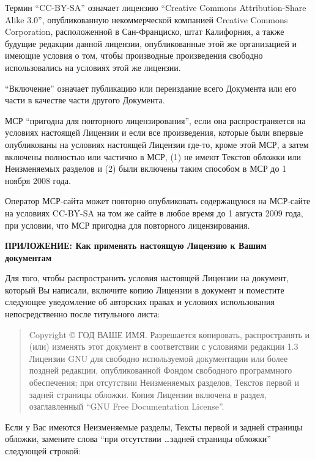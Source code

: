 Термин \enquote{CC-BY-SA} означает лицензию \enquote{Creative Commons
  Attribution-Share Alike 3.0}, опубликованную некоммерческой
компанией Creative Commons Corporation, расположенной в Сан-Франциско,
штат Калифорния, а также будущие редакции данной лицензии,
опубликованные этой же организацией и имеющие условия о том, чтобы
производные произведения свободно использовались на условиях этой же
лицензии.

\enquote{Включение} означает публикацию или переиздание всего
Документа или его части в качестве части другого Документа.

МСР \enquote{пригодна для повторного лицензирования}, если она
распространяется на условиях настоящей Лицензии и если все
произведения, которые были впервые опубликованы на условиях настоящей
Лицензии где-то, кроме этой МСР, а затем включены полностью или
частично в МСР, (1) не имеют Текстов обложки или Неизменяемых разделов
и (2) были включены таким способом в МСР до 1 ноября 2008 года.

Оператор МСР-сайта может повторно опубликовать содержащуюся на
МСР-сайте на условиях CC-BY-SA на том же сайте в любое время до 1
августа 2009 года, при условии, что МСР пригодна для повторного
лицензирования.

\begin{center}
{\Large\bf ПРИЛОЖЕНИЕ: Как применять настоящую Лицензию к Вашим документам\par}
\end{center}

Для того, чтобы распространить условия настоящей Лицензии на документ,
который Вы написали, включите копию Лицензии в документ и поместите
следующее уведомление об авторских правах и условиях использования
непосредственно после титульного листа:

\bigskip
\begin{quote}
Copyright \copyright{} ГОД ВАШЕ ИМЯ. Разрешается копировать,
распространять и (или) изменять этот документ в соответствии с
условиями редакции 1.3 Лицензии GNU для свободно используемой
документации или более поздней редакции, опубликованной Фондом
свободного программного обеспечения; при отсутствии Неизменяемых
разделов, Текстов первой и задней страницы обложки. Копия Лицензии
включена в раздел, озаглавленный \enquote{GNU Free Documentation
License}.
\end{quote}
\bigskip

Если у Вас имеются Неизменяемые разделы, Тексты первой и задней
страницы обложки, замените слова \enquote{при отсутствии \dots задней
страницы обложки} следующей строкой:

